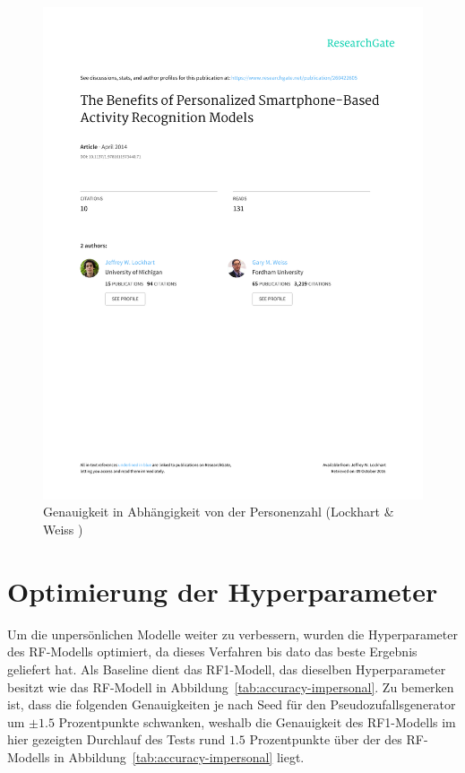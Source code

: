 \begin{figure}
\centering
\includegraphics[clip, trim=22mm 197mm 22mm 27mm, page=8, width=\textwidth]{img/Lockhart2014}
\caption{Genauigkeit in Abhängigkeit von der Personenzahl (Lockhart \& Weiss \cite{Lockhart2014})}
\label{fig:accuracy-convergence-lockhart}
\end{figure}

\section{Optimierung der Hyperparameter}
Um die unpersönlichen Modelle weiter zu verbessern, wurden die Hyperparameter des \acs{RF}-Modells optimiert, da dieses Verfahren bis dato das beste Ergebnis geliefert hat. Als Baseline dient das RF1-Modell, das dieselben Hyperparameter besitzt wie das \acs{RF}-Modell in Abbildung~\ref{tab:accuracy-impersonal}. Zu bemerken ist, dass die folgenden Genauigkeiten je nach Seed für den Pseudozufallsgenerator um $\pm 1.5$ Prozentpunkte schwanken, weshalb die Genauigkeit des RF1-Modells im hier gezeigten Durchlauf des Tests rund $1.5$ Prozentpunkte über der des \acs{RF}-Modells in Abbildung~\ref{tab:accuracy-impersonal} liegt.

